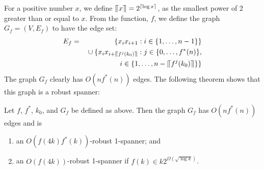 \documentclass{sig-alternate}
\newcommand{\upen}[1]{\llceil#1\rrceil}
\begin{document}
For a positive number $x$, we define $\upen{x}=2^{\ceil{\log x}}$, as
the smallest power of 2 greater than or equal to $x$.  From the function,
$f$, we define the graph $G_f=(V,E_f)$ to have the edge set:
\begin{eqnarray*}
    E_f &=& \quad\left\{ x_ix_{i+1} : i\in\{1,\ldots,n-1\} \right\} \\
     && {} \cup \{ x_{i}x_{i+\upen{f^j(k_0)}} : j\in\{0,\ldots,f^*(n)\}, \\
     && \qquad i\in\{1,\ldots,n-\upen{f^j(k_0)}\} \}
\end{eqnarray*}
The graph $G_f$ clearly has $O(nf^*(n))$ edges.  The following theorem
shows that this graph is a robust spanner:

\begin{thm}
  Let $f$, $f^*$, $k_0$, and $G_f$ be defined as above.  Then the graph
  $G_f$ has $O(nf^*(n))$ edges and is
  \begin{enumerate}
    \item an $O(f(4k)f^*(k))$-robust 1-spanner; and 
    \item an $O(f(4k))$-robust 1-spanner if $f(k)\in k2^{\Omega(\sqrt{\log k})}$.
  \end{enumerate}
\end{thm}
\end{document}
